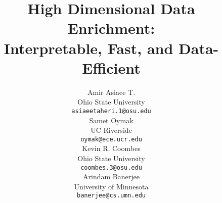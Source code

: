\documentclass{article}
\title{High Dimensional Data Enrichment: \\ Interpretable, Fast, and Data-Efficient}
\author{
	Amir Asiaee T.\\
	Ohio State University\\
	\texttt{asiaeetaheri.1@osu.edu} \\
	\And
	Samet Oymak \\
	UC Riverside \\
	\texttt{oymak@ece.ucr.edu} \\
	\AND
	Kevin R. Coombes\\
	Ohio State University\\
	\texttt{coombes.3@osu.edu} \\
	\And
	Arindam Banerjee\\
	University of Minnesota\\
	\texttt{banerjee@cs.umn.edu} \\
}
\begin{document}
\maketitle


















%
\pagebreak





\appendix


\end{document}

